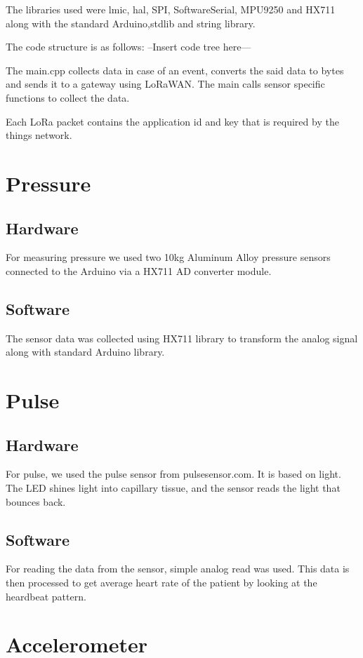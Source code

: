 		The libraries used were lmic, hal, SPI, SoftwareSerial, MPU9250 and HX711 along with the standard Arduino,stdlib and string library.

		The code structure is as follows:
		--Insert code tree here---

		The main.cpp collects data in case of an event, converts the said data to bytes and sends it to a gateway using LoRaWAN. The main calls sensor specific functions to collect the data. 

		Each LoRa packet contains the application id and key that is required by the things network.

\section{Pressure}
	\subsection{Hardware}
	For measuring pressure we used two 10kg Aluminum Alloy pressure sensors connected to the Arduino via a HX711 AD converter module. 

	\subsection{Software}
	The sensor data was collected using HX711 library to transform the analog signal along with standard Arduino library. 

\section{Pulse}

	\subsection{Hardware}
	For pulse, we used the pulse sensor from pulsesensor.com. It is based on light. The LED shines light into capillary tissue, and the sensor reads the light that bounces back.

	\subsection{Software}
	For reading the data from the sensor, simple analog read was used. This data is then processed to get average heart rate of the patient by looking at the heardbeat pattern.

\section{Accelerometer}

